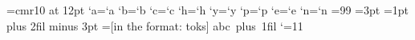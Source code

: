
  
\font\twelve=cmr10 at 12pt
\lccode`a=`a \lccode`b=`b \lccode`c=`c \lccode`h=`h \lccode`y=`y \lccode`p=`p \lccode`e=`e \lccode`n=`n
 
 
\def\inside#1{[in the format: #1]}
=99
=3pt
=1pt plus 2fil minus 3pt
={\inside{toks}}
\hbox{\twelve abc\kern1pt\hskip 3pt plus 1fil}
\catcode`\@=11
\dump

